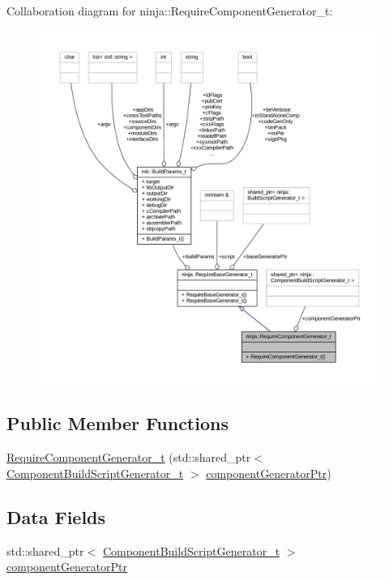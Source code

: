 Collaboration diagram for ninja\+:\+:Require\+Component\+Generator\+\_\+t\+:
\nopagebreak
\begin{figure}[H]
\begin{center}
\leavevmode
\includegraphics[width=350pt]{structninja_1_1_require_component_generator__t__coll__graph}
\end{center}
\end{figure}
\subsection*{Public Member Functions}
\begin{DoxyCompactItemize}
\item 
\hyperlink{structninja_1_1_require_component_generator__t_ab7cba5d3a0acad0a0858ae2ce59a55f4}{Require\+Component\+Generator\+\_\+t} (std\+::shared\+\_\+ptr$<$ \hyperlink{classninja_1_1_component_build_script_generator__t}{Component\+Build\+Script\+Generator\+\_\+t} $>$ \hyperlink{structninja_1_1_require_component_generator__t_a2d8fad572d5c50950a3daf34894b4baa}{component\+Generator\+Ptr})
\end{DoxyCompactItemize}
\subsection*{Data Fields}
\begin{DoxyCompactItemize}
\item 
std\+::shared\+\_\+ptr$<$ \hyperlink{classninja_1_1_component_build_script_generator__t}{Component\+Build\+Script\+Generator\+\_\+t} $>$ \hyperlink{structninja_1_1_require_component_generator__t_a2d8fad572d5c50950a3daf34894b4baa}{component\+Generator\+Ptr}
\end{DoxyCompactItemize}


